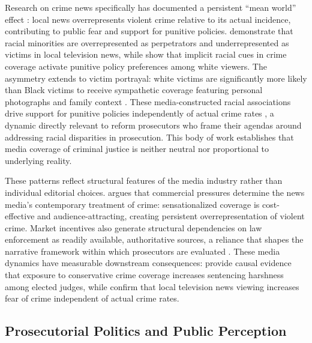 \documentclass[12pt, letterpaper]{article}
\begin{document}
Research on crime news specifically has documented a persistent ``mean world'' effect \citep{gerbner2002}: local news overrepresents violent crime relative to its actual incidence, contributing to public fear and support for punitive policies. \citet{dixon2000} demonstrate that racial minorities are overrepresented as perpetrators and underrepresented as victims in local television news, while \citet{gilliam2000} show that implicit racial cues in crime coverage activate punitive policy preferences among white viewers. The asymmetry extends to victim portrayal: white victims are significantly more likely than Black victims to receive sympathetic coverage featuring personal photographs and family context \citep{gsg2021}. These media-constructed racial associations drive support for punitive policies independently of actual crime rates \citep{ghandnoosh2014}, a dynamic directly relevant to reform prosecutors who frame their agendas around addressing racial disparities in prosecution. This body of work establishes that media coverage of criminal justice is neither neutral nor proportional to underlying reality.

These patterns reflect structural features of the media industry rather than individual editorial choices. \citet{beale2006} argues that commercial pressures determine the news media's contemporary treatment of crime: sensationalized coverage is cost-effective and audience-attracting, creating persistent overrepresentation of violent crime. Market incentives also generate structural dependencies on law enforcement as readily available, authoritative sources, a reliance that shapes the narrative framework within which prosecutors are evaluated \citep{beale2006,surette2015}. These media dynamics have measurable downstream consequences: \citet{ash2024} provide causal evidence that exposure to conservative crime coverage increases sentencing harshness among elected judges, while \citet{romer2003} confirm that local television news viewing increases fear of crime independent of actual crime rates.

\subsection{Prosecutorial Politics and Public Perception}
\end{document}
